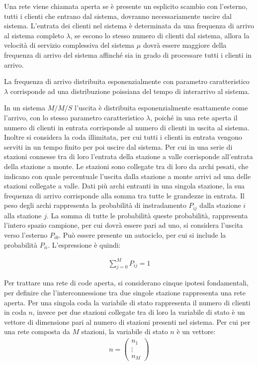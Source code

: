 \documentclass{article}
\numberwithin{equation}{subsection}
\begin{document}
Una rete viene chiamata aperta se è presente un esplicito scambio con l'esterno, tutti i clienti che entrano dal sistema, dovranno necessariamente uscire dal sistema. 
L'entrata dei clienti nel sistema è determinata da una frequenza di arrivo al sistema completo $\lambda$, se escono lo stesso numero di clienti dal sistema, allora 
la velocità di servizio complessiva del sistema $\mu$ dovrà essere maggiore della frequenza di arrivo del sistema affinché sia in grado di processare tutti i clienti in 
arrivo.  

La frequenza di arrivo distribuita esponenzialmente con parametro caratteristico $\lambda$ corrisponde ad una distribuzione poissiana del tempo di interarrivo al 
sistema. 


In un sistema $M/M/S$ l'uscita è distribuita esponenzialmente esattamente come l'arrivo, con lo stesso parametro caratteristico $\lambda$, poiché in una rete aperta 
il numero di clienti in entrata corrisponde al numero di clienti in uscita al sistema. Inoltre si considera la coda illimitata, per cui tutti i clienti in entrata vengono 
serviti in un tempo finito per poi uscire dal sistema. 
Per cui in una serie di stazioni connesse tra di loro l'entrata della stazione a valle corrisponde all'entrata della stazione a monte. Le stazioni sono collegate tra di loro 
da archi pesati, che indicano con quale percentuale l'uscita dalla stazione a monte arrivi ad una delle stazioni collegate a valle. 
Dati più archi entranti in una singola stazione, la sua frequenza di arrivo corrisponde alla somma tra tutte le grandezze in entrata. 
Il peso degli archi rappresenta la probabilità di instradamento $P_{ij}$ dalla stazione $i$ alla stazione $j$. La somma di tutte le probabilità queste probabilità, rappresenta 
l'intero spazio campione, per cui dovrà essere pari ad uno, si considera l'uscita verso l'esterno $P_{i0}$. Può essere presente un autociclo, per cui si include la probabilità 
$P_{ii}$. L'espressione è quindi: 

\begin{gather}
    \displaystyle\sum_{j=0}^{M}P_{ij}=1
\end{gather} 

Per trattare una rete di code aperta, si considerano cinque ipotesi fondamentali, per definire che l'interconnessione tra due singole stazione rappresenta una rete aperta. Per 
una singola coda la variabile di stato rappresenta il numero di clienti in coda $n$, invece per due stazioni collegate tra di loro la variabile di stato è un vettore di 
dimensione pari al numero di stazioni presenti nel sistema. Per cui per una rete composta da $M$ stazioni, la variabile di stato $n$ è un vettore:
\begin{gather}
    n=\begin{pmatrix}
       n_1\\
       \vdots\\
       n_M 
    \end{pmatrix}
\end{gather}
\end{document}
